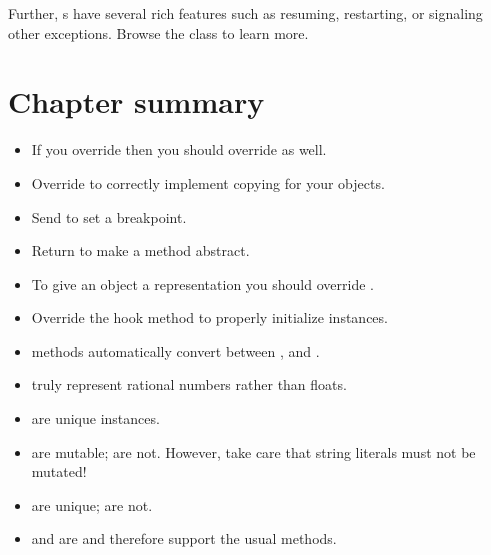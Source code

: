 \documentclass[a4paper,10pt,twoside]{book}
\begin{document}

Further, s have several rich features such as resuming, restarting, or signaling other exceptions. 
Browse the class  to learn more.


\section{Chapter summary}

\begin{itemize}

  \item If you override \ct{=} then you should override  as well.

  \item Override  to correctly implement copying for your objects.

  \item Send  to set a breakpoint.

  \item Return  to make a method abstract.

  \item To give an object a  representation you should override .

  \item Override the hook method  to properly initialize instances.

  \item {} methods automatically convert between ,  and .

  \item {} truly represent rational numbers rather than floats.

  \item {} are unique instances.

  \item {} are mutable;  are not.
  However, take care that string literals must not be mutated!

  \item {} are unique;  are not.

  \item {} and  are  and therefore support the usual  methods.

\end{itemize}

\ifx\wholebook\relax\else
   
   
\end{document}

